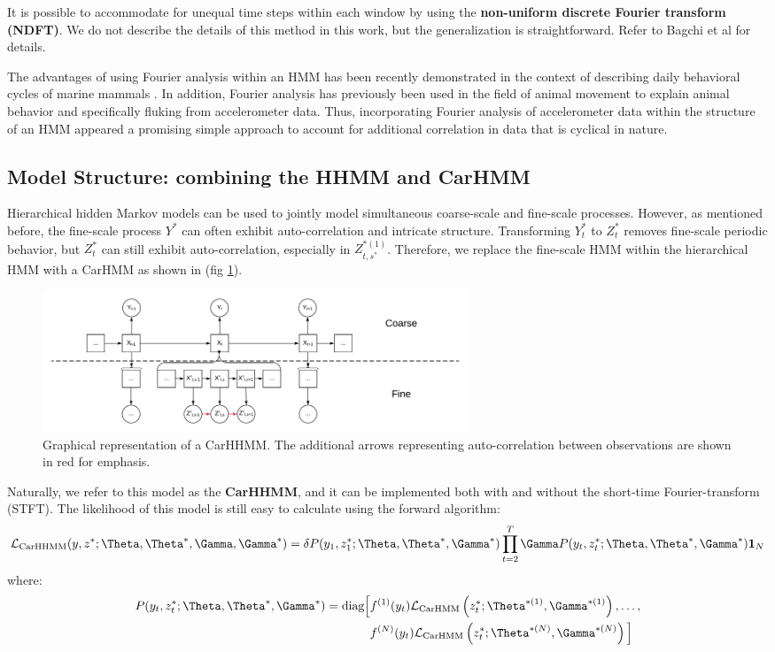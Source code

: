 It is possible to accommodate for unequal time steps within each window by using the \textbf{non-uniform discrete Fourier transform (NDFT)}. We do not describe the details of this method in this work, but the generalization is straightforward. Refer to Bagchi et al \citep{Bagchi:1999} for details.

The advantages of using Fourier analysis within an HMM has been recently demonstrated in the context of describing daily behavioral cycles of marine mammals \citep{Heerah:2017}. In addition, Fourier analysis has previously been used in the field of animal movement to explain animal behavior \citep{Fehlmann:2017} and specifically fluking \citep{Shorter:2017} from accelerometer data. Thus, incorporating Fourier analysis of accelerometer data within the structure of an HMM appeared a promising simple approach to account for additional correlation in data that is cyclical in nature.

\subsection{Model Structure: combining the HHMM and CarHMM}
\label{subsec:model_structure}

Hierarchical hidden Markov models can be used to jointly model simultaneous coarse-scale and fine-scale processes. However, as mentioned before, the fine-scale process $Y^*$ can often exhibit auto-correlation and intricate structure. Transforming $Y^*_t$ to $Z^*_t$ removes fine-scale periodic behavior, but $Z^*_t$ can still exhibit auto-correlation, especially in $Z_{t,s^*}^{*(1)}$. Therefore, we replace the fine-scale HMM within the hierarchical HMM with a CarHMM as shown in (fig \ref{fig:CarHHMM}).
%
\begin{figure}[ht]
	\centering
	\includegraphics[width=5in]{../Plots/CarHHMM.png}
	\caption{Graphical representation of a CarHHMM. The additional arrows representing auto-correlation between observations are shown in red for emphasis.}
	\label{fig:CarHHMM}
\end{figure}
%
Naturally, we refer to this model as the \textbf{CarHHMM}, and it can be implemented both with and without the short-time Fourier-transform (STFT). The likelihood of this model is still easy to calculate using the forward algorithm:
%
$$\calL_{\text{CarHHMM}}(y,z^*;\Theta,\Theta^*,\Gamma,\Gamma^*) = \delta P(y_1,z_1^*;\Theta,\Theta^*,\Gamma^*) \prod_{t=2}^T \Gamma P(y_t,z_t^*;\Theta,\Theta^*,\Gamma^*) \mathbf{1}_N$$
%
where:
%
\begin{align*}
P(y_t,z_t^*;\Theta,\Theta^*,\Gamma^*)  = \text{diag}\Big[&f^{(1)}(y_t)\calL_{\text{CarHMM}}\left(z_t^*;\Theta^{*(1)},\Gamma^{*(1)}\right), \ldots , \\
&f^{(N)}(y_t)\calL_{\text{CarHMM}}\left(z_t^*;\Theta^{*(N)},\Gamma^{*(N)}\right) \Big]
\end{align*}
%